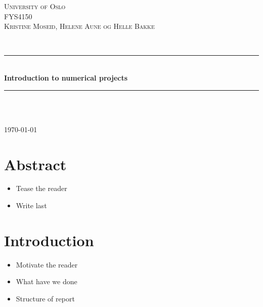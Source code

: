 \documentclass[12pt]{article}
\begin{document}
\begin{titlepage}

\newcommand{\HRule}{\rule{\linewidth}{0.5mm}}
\center

\textsc{\LARGE University of Oslo}\\[1.5cm]
\textsc{\Large FYS4150}\\[0.5cm]
\textsc{\large Kristine Moseid, Helene Aune og Helle Bakke}\\[0.5cm]

\begin{minipage}{0.4\textwidth}
\end{minipage}\\[1cm]

\HRule \\[0.4cm]
{ \huge \bfseries Introduction to numerical projects}\\[0.4cm]
\HRule \\[1.5cm]

\begin{minipage}{0.4\textwidth}
\end{minipage}\\[8cm]


{\large \today}\\[3cm]
\vfill

\end{titlepage}

\newpage
\tableofcontents

\newpage

\section{Abstract}

\begin{itemize}
\item Tease the reader
\item Write last
\end{itemize}

\section{Introduction}

\begin{itemize}
\item Motivate the reader
\item What have we done
\item Structure of report
\end{itemize}
\end{document}
